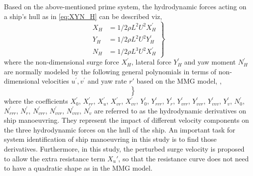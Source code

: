 \noindent Based on the above-mentioned prime system, the hydrodynamic forces acting on a ship's hull as in \autoref{eq:XYN_H} can be described viz,
\begin{equation}
    \label{eq:XYN_H}
    \left.\begin{aligned}
    X_H & = 1/2\rho L^{2} U^{2} X_H^{'}  \\
    Y_H & = 1/2\rho L^{2} U^{2} Y_H^{'}  \\
    N_H & = 1/2\rho L^{3} U^{2} X_H^{'}
    \end{aligned}\right\}
\end{equation}
where the non-dimensional surge force $X_H^{'}$, lateral force $Y_H^{'}$ and yaw moment $N_H^{'}$ are normally modeled by the following general polynomials in terms of non-dimensional velocities $u^{'}, v^{'}$ and yaw rate $r'$ based on the MMG model, \citep{yasukawaIntroductionMMGStandard2015},
\begin{equation}
    \label{eq:XYN_H_prime}
    \left.\begin{aligned}
    &  \\
    &  \\
    & 
    \end{aligned}\right\}
\end{equation}
where the coefficients $X_0^{'}$, $X_{rr}^{'}$, $X_u^{'}$, $X_{vr}^{'}$, $X_{vv}^{'}$, $Y_{0}^{'}$, $Y_{rrr}^{'}$, $Y_{r}^{'}$, $Y_{vrr}^{'}$, $Y_{vvr}^{'}$, $Y_{vvv}^{'}$, $Y_{v}^{'}$, $N_{0}^{'}$, $N_{rrr}^{'}$, $N_{r}^{'}$, $N_{vrr}^{'}$, $N_{vvr}^{'}$, $N_{vvv}^{'}$, $N_{v}^{'}$ are referred to as the hydrodynamic derivatives on ship manoeuvring. They represent the impact of different velocity components on the three hydrodynamic forces on the hull of the ship. An important task for system identification of ship manoeuvring in this study is to find those derivatives. Furthermore, in this study, the perturbed surge velocity is proposed to allow the extra resistance term ${X_u}'$, so that the resistance curve does not need to have a quadratic shape as in the MMG model.  
%
%     
%     

